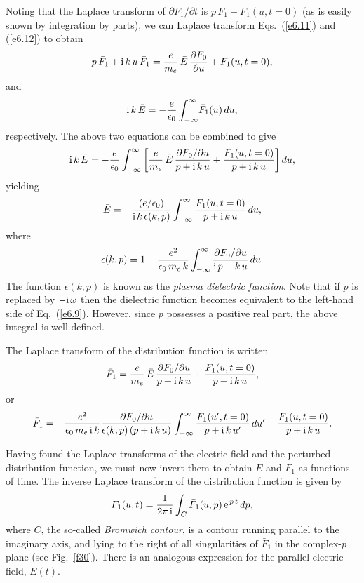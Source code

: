 Noting that the Laplace transform of $\partial F_1/\partial t$ is $p\,\bar{F}_1-F_1(u,t=0)$
(as is easily shown by integration by parts), we can Laplace transform Eqs.~(\ref{e6.11})
and (\ref{e6.12}) to obtain
\begin{equation}
p\,\bar{F}_1 + {\rm i}\,k\,u\,\bar{F}_1 = \frac{e}{m_e}\,\bar{E}\,\frac{\partial
F_0}{\partial u} + F_1(u,t=0),
\end{equation}
and
\begin{equation}
{\rm i}\,k\,\bar{E} =-\frac{e}{\epsilon_0}\int_{-\infty}^{\infty}\!\bar{F}_1(u)\,
du,
\end{equation}
respectively.
The above two equations can be combined to give
\begin{equation}
{\rm i}\,k\,\bar{E} = -\frac{e}{\epsilon_0}\int_{-\infty}^{\infty}
\left[ \frac{e}{m_e}\,\bar{E}\,\frac{\partial F_0/\partial u}
{p + {\rm i}\,k\,u} + \frac{F_1(u,t=0)}{p+{\rm i}\,k\,u}\right] du,
\end{equation}
yielding
\begin{equation}\label{e6.17}
\bar{E} = -\frac{(e/\epsilon_0)}{{\rm i}\,k\,\epsilon(k,p)}
\int_{-\infty}^\infty \frac{F_1(u,t=0)}{p+{\rm i}\,k\,u}\,du,
\end{equation}
where
\begin{equation}
\epsilon(k,p) = 1 + \frac{e^2}{\epsilon_0\,m_e\,k}
\int_{-\infty}^{\infty} \frac{\partial F_0/\partial u}{{\rm i}\,p-
k\,u}\,du.
\end{equation}
The function $\epsilon(k,p)$ is known as the {\em plasma dielectric
function}. Note that if $p$ is replaced by $-{\rm i}\,\omega$ then
the dielectric function becomes equivalent to the left-hand side
of Eq.~(\ref{e6.9}). However, since $p$ possesses a positive real part, the above
integral is well defined.

The Laplace transform of the distribution function is written
\begin{equation}
\bar{F}_1 = \frac{e}{m_e}\,\bar{E}\, \frac{\partial F_0/\partial u}
{p+ {\rm i}\,k\,u} + \frac{F_1(u,t=0)}{p+ {\rm i}\,k\,u},
\end{equation}
or
\begin{equation}\label{e6.20}
\bar{F}_1 = - \frac{e^2}{\epsilon_0\,m_e\,{\rm i}\,k} \frac{\partial F_0/\partial u}
{\epsilon(k, p)\,(p + {\rm i}\,k\,u)}
\int_{-\infty}^\infty \frac{F_1(u',t=0)}
{p+ {\rm i}\,k\,u'}\,du' + \frac{F_1(u,t=0)}{p+ {\rm i}\,k\,u}.
\end{equation}

Having found the Laplace transforms of the electric field and the perturbed
distribution function, we must now invert them to obtain
 $E$ and $F_1$  as functions of time. The inverse Laplace transform
of the distribution function is given by
\begin{equation}\label{e6.21}
F_1(u,t) = \frac{1}{2\pi\,{\rm i}}\int_C \bar{F}_1(u,p)\,{\rm e}^{\,p\,t}\,dp,
\end{equation}
where $C$, the so-called {\em Bromwich contour}, is a contour running parallel to
the imaginary axis, and lying to the right of all singularities of $\bar{F}_1$
in the complex-$p$ plane (see Fig.~\ref{f30}). There is an analogous
expression for the parallel electric field, $E(t)$. 

